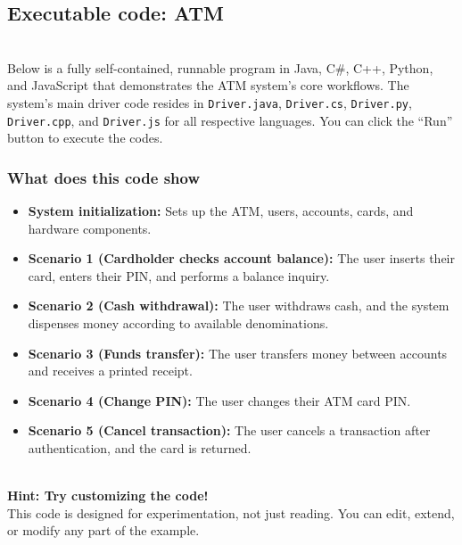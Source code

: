 \subsection{Executable code: ATM}\label{QbSyGqLz6KQcD27Ja5D3c}
\\
Below is a fully self-contained, runnable program in Java, C\#, C++, Python, and JavaScript that demonstrates the ATM system's core workflows. The system's main driver code resides in \texttt{Driver.java}, \texttt{Driver.cs}, \texttt{Driver.py}, \texttt{Driver.cpp}, and \texttt{Driver.js} for all respective languages. You can click the ``Run'' button to execute the codes.

\subsubsection{What does this code show}\label{MsIhWQoRnpv9oTIkc4eX2}

\begin{itemize}
\item
\protect{}\label{nkOQPvrgMBRrz4lHhkKl0}
\textbf{System initialization:} Sets up the ATM, users, accounts, cards, and hardware components.
\item
\protect{}\label{IY-pBdf1-lbD_oUFAeNp0}
\textbf{Scenario 1 (Cardholder checks account balance):} The user inserts their card, enters their PIN, and performs a balance inquiry.
\item
\protect{}\label{bK8bLld3B_fSw3roIKxNa}
\textbf{Scenario 2 (Cash withdrawal):} The user withdraws cash, and the system dispenses money according to available denominations.
\item
\protect{}\label{Clf3SXMkuz8xWW-KYwW9d}
\textbf{Scenario 3 (Funds transfer):} The user transfers money between accounts and receives a printed receipt.
\item
\protect{}\label{n5BqU9zApm1PFXCig7KBr}
\textbf{Scenario 4 (Change PIN):} The user changes their ATM card PIN.
\item
\protect{}\label{WckOa4qqGS1hHhyrPk1UB}
\textbf{Scenario 5 (Cancel transaction):} The user cancels a transaction after authentication, and the card is returned.
\end{itemize}
\\
\textbf{Hint: Try customizing the code!}
\\
This code is designed for experimentation, not just reading. You can edit, extend, or modify any part of the example.

